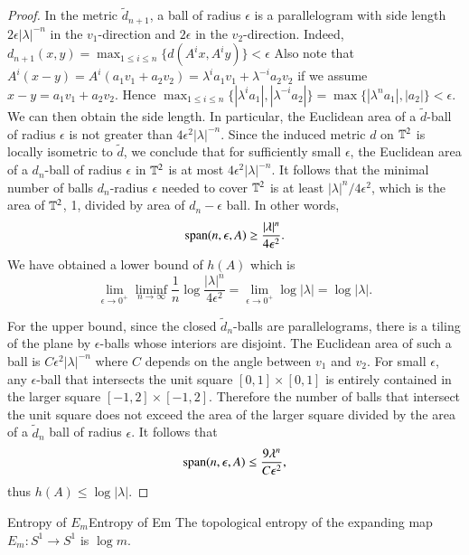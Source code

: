\documentclass[12pt,a4paper]{article}
\begin{document}
\begin{proof}
		In the metric $\tilde{d}_{n+1}$, a ball of radius $\epsilon$ is a parallelogram with side length $2\epsilon |\lambda|^{-n}$ in the $v_1$-direction and $2\epsilon$ in the $v_2$-direction. Indeed, $d_{n+1}(x,y)=\max_{1\leq i\leq n}\{ d(A^ix, A^i y)\}<\epsilon$ Also note that $A^i(x-y)=A^i(a_1v_1+a_2v_2)=\lambda^i a_1 v_1+\lambda^{-i} a_2v_2$ if we assume $x-y=a_1v_1+a_2v_2$. Hence $\max_{1\leq i\leq n}\{|\lambda^i a_1|,|\lambda^{-i}a_2|\}=\max\{|\lambda^n a_1|,|a_2|\}<\epsilon$. We can then obtain the side length. In particular, the Euclidean area of a $\tilde{d}$-ball of radius $\epsilon$ is not greater than $4\epsilon^2|\lambda|^{-n}$. Since the induced metric $d$ on $\mathbb{T}^2$ is locally isometric to $\tilde{d}$, we conclude that for sufficiently small $\epsilon$, the Euclidean area of a $d_n$-ball of radius $\epsilon$ in $\mathbb{T}^2$ is at most $4\epsilon^2 |\lambda|^{-n}$. It follows that the minimal number of balls $d_n$-radius $\epsilon$ needed to cover $\mathbb{T}^2$ is at least $|\lambda|^n/4\epsilon^2$, which is the area of $\mathbb{T}^2$, 1, divided by area of $d_n-\epsilon$ ball. In other words, 
		$$
		\text{span}(n,\epsilon, A)\geq \frac{|\lambda|^n}{4\epsilon^2}.
		$$
		We have obtained a lower bound of $h(A)$ which is
		$$
		\lim_{\epsilon\to 0^+}\liminf_{n\to\infty} \frac{1}{n}\log \frac{|\lambda|^n}{4\epsilon^2} = \lim_{\epsilon\to 0^+} \log|\lambda|=\log|\lambda|.
		$$
		
		For the upper bound, since the closed $\tilde{d}_n$-balls are parallelograms, there is a tiling of the plane by $\epsilon$-balls whose interiors are disjoint. The Euclidean area of such a ball is $C \epsilon^2 |\lambda|^{-n}$ where $C$ depends on the angle between $v_1$ and $v_2$. For small $\epsilon$, any $\epsilon$-ball that intersects the unit square $[0,1]\times [0,1]$ is entirely contained in the larger square $[-1,2]\times [-1,2]$. Therefore the number of balls that intersect the unit square does not exceed the area of the larger square divided by the area of a $\tilde{d}_n$ ball of radius $\epsilon$. It follows that
		$$
		\text{span} (n,\epsilon,A)\leq \frac{9\lambda^n}{C\epsilon^2},
		$$
		thus $h(A)\leq \log|\lambda|$.
	\end{proof}
	
	
	\begin{proposition}{Entropy of $E_m$}{Entropy of Em}
		The topological entropy of the expanding map $E_m:S^1\rightarrow S^1$ is $\log m$.
	\end{proposition}
	
\end{document}
